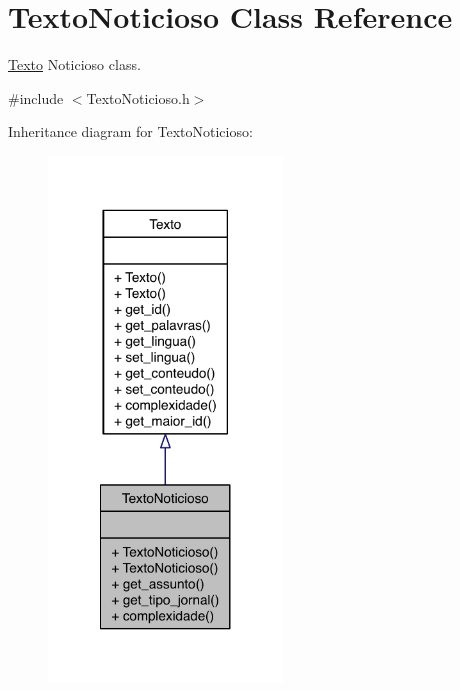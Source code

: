 \hypertarget{class_texto_noticioso}{\section{Texto\-Noticioso Class Reference}
\label{class_texto_noticioso}
}


\hyperlink{class_texto}{Texto} Noticioso class.  




{\ttfamily \#include $<$Texto\-Noticioso.\-h$>$}



Inheritance diagram for Texto\-Noticioso\-:
\nopagebreak
\begin{figure}[H]
\begin{center}
\leavevmode
\includegraphics[width=176pt]{class_texto_noticioso__inherit__graph}
\end{center}
\end{figure}
